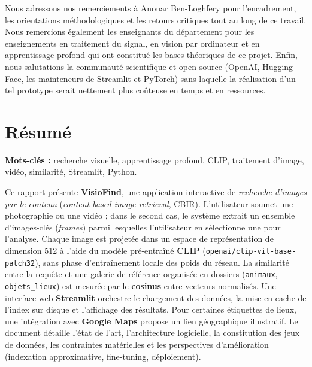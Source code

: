 \documentclass[11pt,a4paper,openany]{report}
\newcommand{\Encadrant}{Anouar Ben-Loghfery}
\begin{document}
Nous adressons nos remerciements à \Encadrant{} pour l'encadrement, les orientations méthodologiques et les retours critiques tout au long de ce travail. Nous remercions également les enseignants du département pour les enseignements en traitement du signal, en vision par ordinateur et en apprentissage profond qui ont constitué les bases théoriques de ce projet. Enfin, nous salutations la communauté scientifique et open source (OpenAI, Hugging Face, les mainteneurs de Streamlit et PyTorch) sans laquelle la réalisation d'un tel prototype serait nettement plus coûteuse en temps et en ressources.

\cleardoublepage

\chapter*{Résumé}

\textbf{Mots-clés :} recherche visuelle, apprentissage profond, CLIP, traitement d'image, vidéo, similarité, Streamlit, Python.

Ce rapport présente \textbf{VisioFind}, une application interactive de \emph{recherche d'images par le contenu} (\emph{content-based image retrieval}, CBIR). L'utilisateur soumet une photographie ou une vidéo ; dans le second cas, le système extrait un ensemble d'images-clés (\emph{frames}) parmi lesquelles l'utilisateur en sélectionne une pour l'analyse. Chaque image est projetée dans un espace de représentation de dimension 512 à l'aide du modèle pré-entraîné \textbf{CLIP} (\texttt{openai/clip-vit-base-patch32}), sans phase d'entraînement locale des poids du réseau. La similarité entre la requête et une galerie de référence organisée en dossiers (\texttt{animaux}, \texttt{objets\_lieux}) est mesurée par le \textbf{cosinus} entre vecteurs normalisés. Une interface web \textbf{Streamlit} orchestre le chargement des données, la mise en cache de l'index sur disque et l'affichage des résultats. Pour certaines étiquettes de lieux, une intégration avec \textbf{Google Maps} propose un lien géographique illustratif. Le document détaille l'état de l'art, l'architecture logicielle, la constitution des jeux de données, les contraintes matérielles et les perspectives d'amélioration (indexation approximative, fine-tuning, déploiement).
\end{document}
